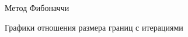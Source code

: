 \documentclass[11pt]{article}
\begin{document}
\begin{figure}[h]
\begin{minipage}[h]{0.47\linewidth}
             Метод Фибоначчи \\
        \end{minipage}
        \caption{Графики отношения размера границ с итерациями}
    \end{figure}
\end{document}
